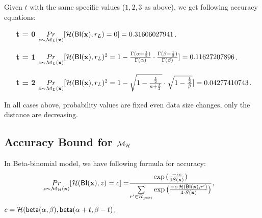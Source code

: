 \documentclass{article}
\begin{document}
Given $t$ with the same specific values ($1, 2, 3$ as above), we get following accuracy equations:

\begin{itemize}
  \item[\textbf{t = 0}] $\underset{z \thicksim \mathcal{M}_L(\textbf{x})}{Pr}[\mathcal{H}(\mathsf{BI}(\textbf{x}), r_L ) = 0] = 0.31606027941$.
  \item[\textbf{t = 1}]
  $\underset{z \thicksim \mathcal{M}_L(\textbf{x})}{Pr}[\mathcal{H}(\mathsf{BI}(\textbf{x}), r_L )^2 = 1 - \frac{\Gamma(\alpha+\frac{1}{2})}{\Gamma(\alpha)} \cdot
  \frac{\Gamma(\beta - \frac{1}{2})}{\Gamma(\beta)} ] = 0.11627207896$. 
  \item[\textbf{t = 2}]$\underset{z \thicksim \mathcal{M}_L(\textbf{x})}{Pr}[\mathcal{H}(\mathsf{BI}(\textbf{x}), r_L )^2 = 1 - 
  \sqrt{1 - \frac{\frac{t}{2}}{a + \frac{t}{2}}}
  \cdot
  \sqrt{1 - \frac{\frac{t}{2}}{\beta}}] = 0.04277410743$.
\end{itemize}
In all cases above, probability values are fixed even data size changes, only the distance are decreasing.

\subsection{Accuracy Bound for $\mathcal{M}_{\mathcal{H}}$}
\label{subsec_accuracy_smoo}
  In Beta-binomial model,
  we have following formula for accuracy:
  \begin{align}
  \label{eq_acc}
  \underset{z \thicksim \mathcal{M}_{\mathcal{H}}(\textbf{x})}{Pr}[\mathcal{H}(\mathsf{BI}(\textbf{x}), z) = c] 
  = & \frac{\exp{(\frac{- \epsilon c}{4 S(\textbf{x})})}}{\sum\limits_{r'\in \mathcal{R}_{\textup{post}}} \exp \big(\frac{-\epsilon\cdot \mathcal{H} (\mathsf{BI}(\textbf{x}),r')}{4 \cdot S(\textbf{x})}\big)},
  \end{align}
  $c = \mathcal{H}(\mathsf{beta}(\alpha, \beta), \mathsf{beta}(\alpha + t, \beta - t)$.\\
\end{document}
